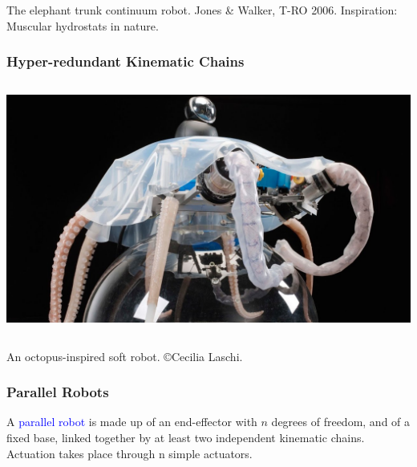 \begin{frame}
\begin{columns}[b]
\begin{column}{.33\columnwidth}
\begin{tcolorbox}[colframe=blue!80!green, coltitle=white!80,toggle enlargement=none]
			\end{tcolorbox}
		\end{column}	
		\end{columns}
		\centering \footnotesize{The elephant trunk continuum robot. Jones \& Walker, T-RO 2006. Inspiration: Muscular hydrostats in nature.}
	\end{frame}

\begin{frame}
	\frametitle{Hyper-redundant Kinematic Chains}
	\begin{columns}[b]
		\begin{column}{.98\columnwidth}			
			\begin{tcolorbox}[colframe=blue!80!green, coltitle=white!80,toggle enlargement=none]
				\centering 
				\includegraphics[width=\textwidth]{../Notes/figures/octopus.jpg}
			\end{tcolorbox}
		\end{column}	
	\end{columns}
	 \centering \footnotesize{An octopus-inspired soft robot. \copyright Cecilia Laschi.}
\end{frame}
	
	
	\begin{frame}
		\frametitle{Parallel Robots}
		\begin{tcolorbox}[title=Mehlet 2015,toggle enlargement=none]
			A \textcolor{blue}{parallel robot} is made up of an end-effector with $n$ degrees of freedom, and of a fixed base, linked together by at least two independent kinematic chains. Actuation takes place through n simple actuators.
		\end{tcolorbox}	
	\end{frame}
	
